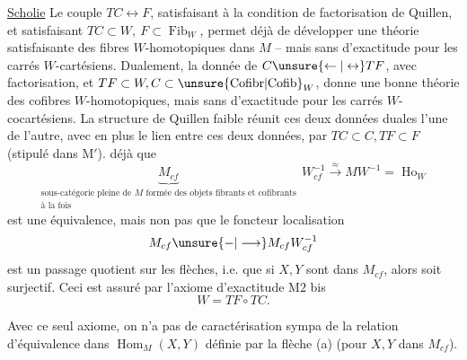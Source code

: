 \uline{Scholie}\unsure{:} Le couple $TC\longleftrightarrow F$, satisfaisant à la condition de factorisation de Quillen, et satisfaisant $TC\subset W,\ F\subset\operatorname{Fib}_{W}$, permet déjà de développer une théorie satisfaisante des fibres $W$-homotopiques dans $M$ -- mais sans   d'exactitude pour les carrés $W$-cartésiens. Dualement, la donnée de $C\unsure{\leftarrow|\leftrightarrow}TF$, avec factorisation, et $TF\subset W,C\subset\operatorname{\unsure{Cofibr|Cofib}}_{W}$, donne une bonne théorie des cofibres $W$-homotopiques, mais sans   d'exactitude pour les carrés $W$-cocartésiens. La structure de Quillen faible réunit ces deux données duales l'une de l'autre, avec en plus le lien   entre ces deux données, par $TC\subset C,TF\subset F$ (stipulé dans $\mathrm M'$).   déjà que
\[
\underbrace{M_{cf}}_{\substack{\text{sous-catégorie pleine de }M\text{ formée des objets fibrants et cofibrants}\\\text{à la fois}}}\,W_{cf}^{-1}\xrightarrow{\approx}MW^{-1}=\operatorname{Ho}_{W}
\]
est une équivalence, mais non pas que le foncteur localisation
\[
 M_{cf}\unsure{-|\longrightarrow}M_{cf}W_{cf}^{-1}
\]
est un  passage  quotient sur les flèches, i.e. que si $X,Y$ sont dans $M_{cf}$, alors
soit surjectif. Ceci est assuré par l'axiome d'exactitude $\mathrm M2$ bis
\[
 W=TF\circ TC.
\]

 Avec ce seul axiome, on n'a pas de caractérisation sympa de la relation d'équivalence dans $\operatorname{Hom}_{M}(X,Y)$ définie par la flèche (a) (pour $X,Y$ dans $M_{cf}$).

